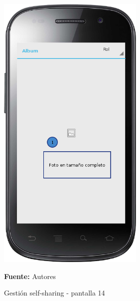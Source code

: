 \begin{figure}[!htb]
  \begin{center}
    \includegraphics[width=7cm]{./imagenes/UI/Self_sharing/self_sharing_14.png}
    \caption{Gestión self-sharing - pantalla 14}
    \label{fig:self_sharing_14}
    \textbf{Fuente:}  Autores
  \end{center}
\end{figure}

